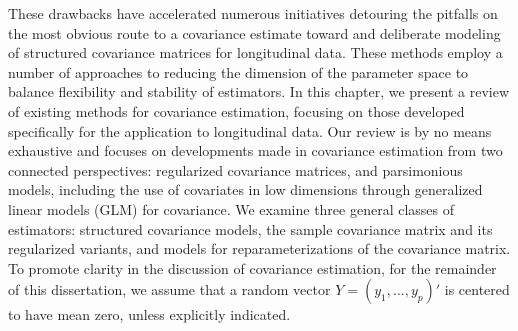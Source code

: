 These drawbacks have accelerated numerous initiatives detouring the pitfalls on the most obvious route to a covariance estimate toward and deliberate modeling of structured covariance matrices for longitudinal data. These methods employ a number of approaches to reducing the dimension of the parameter space to balance flexibility and stability of estimators. In this chapter, we present a review of existing methods for covariance estimation, focusing on those developed specifically for the application to longitudinal data. Our review is by no means exhaustive and focuses on developments made in covariance estimation from two connected perspectives: regularized covariance matrices, and parsimonious models, including the use of covariates in low dimensions through generalized linear models (GLM) for covariance. We examine three general classes of estimators: structured covariance models, the sample covariance matrix and its regularized variants, and models for reparameterizations of the covariance matrix. To promote clarity in the discussion of covariance estimation, for the remainder of this dissertation, we assume that a random vector $Y = \left(y_1, \dots, y_p \right)'$ is centered to have mean zero, unless explicitly indicated.

\bigskip

%




\bigskip




